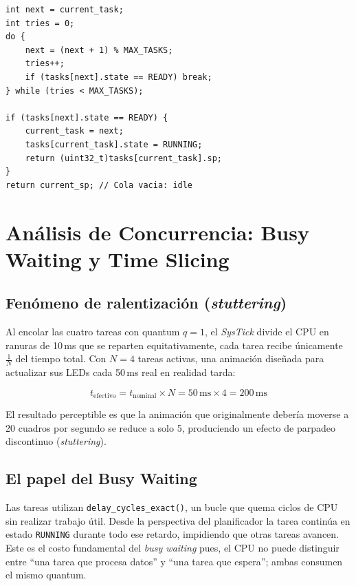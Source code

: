 \documentclass[12pt,letterpaper]{article}
\begin{document}
\begin{lstlisting}[style=modernc, caption={Búsqueda Round Robin en \texttt{schedule()}}]
int next = current_task;
int tries = 0;
do {
    next = (next + 1) % MAX_TASKS;
    tries++;
    if (tasks[next].state == READY) break;
} while (tries < MAX_TASKS);
 
if (tasks[next].state == READY) {
    current_task = next;
    tasks[current_task].state = RUNNING;
    return (uint32_t)tasks[current_task].sp;
}
return current_sp; // Cola vacia: idle
\end{lstlisting}
 
\section*{Análisis de Concurrencia: Busy Waiting y Time Slicing}
 
\subsection*{Fenómeno de ralentización (\textit{stuttering})}
 
Al encolar las cuatro tareas con quantum $q=1$, el \textit{SysTick} divide el CPU en ranuras de 10\,ms que se reparten equitativamente, cada tarea recibe únicamente $\frac{1}{N}$ del tiempo total. Con $N=4$ tareas activas, una animación diseñada para actualizar sus LEDs cada 50\,ms real en realidad tarda:
 
\[
  t_{\text{efectivo}} = t_{\text{nominal}} \times N = 50\,\text{ms} \times 4 = 200\,\text{ms}
\]
 
El resultado perceptible es que la animación que originalmente debería moverse a 20 cuadros por segundo se reduce a solo 5, produciendo un efecto de parpadeo discontinuo (\textit{stuttering}).
 
\subsection*{El papel del Busy Waiting} 
Las tareas utilizan \texttt{delay\_cycles\_exact()}, un bucle que quema ciclos de CPU sin realizar trabajo útil.  Desde la perspectiva del planificador la tarea continúa en estado \texttt{RUNNING} durante todo ese retardo, impidiendo que otras tareas avancen. Este es el costo fundamental del \textit{busy waiting} pues, el CPU no puede distinguir entre ``una tarea que procesa datos'' y ``una tarea que espera''; ambas consumen el mismo quantum.\\
\end{document}
